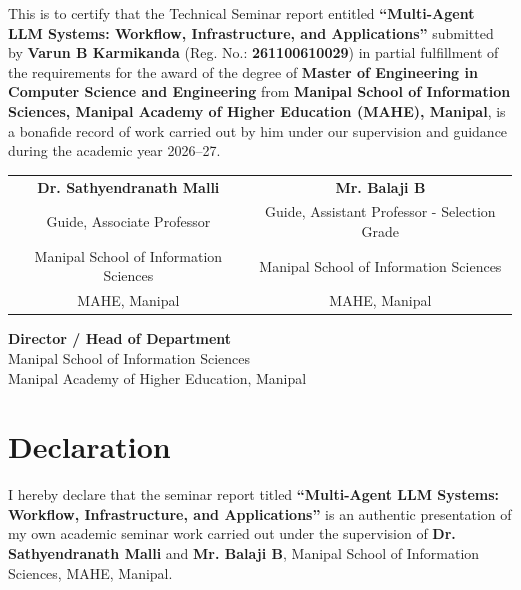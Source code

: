 \documentclass[12pt,a4paper]{report}
\begin{document}
\noindent This is to certify that the Technical Seminar report entitled \textbf{``Multi-Agent LLM Systems: Workflow, Infrastructure, and Applications''} submitted by \textbf{Varun B Karmikanda} (Reg. No.: \textbf{261100610029}) in partial fulfillment of the requirements for the award of the degree of \textbf{Master of Engineering in Computer Science and Engineering} from \textbf{Manipal School of Information Sciences, Manipal Academy of Higher Education (MAHE), Manipal}, is a bonafide record of work carried out by him under our supervision and guidance during the academic year 2026--27.

\vspace{2.5cm}

\noindent
\begin{tabular*}{\textwidth}{@{\extracolsep{\fill}}cc}
\textbf{Dr. Sathyendranath Malli} & \textbf{Mr. Balaji B} \\
Guide, Associate Professor & Guide, Assistant Professor - Selection Grade \\
Manipal School of Information Sciences & Manipal School of Information Sciences \\
MAHE, Manipal & MAHE, Manipal \\
\end{tabular*}

\vspace{2.5cm}

\noindent
\begin{center}
\textbf{Director / Head of Department} \\
Manipal School of Information Sciences \\
Manipal Academy of Higher Education, Manipal
\end{center}

\newpage
\chapter*{Declaration}

\noindent I hereby declare that the seminar report titled \textbf{``Multi-Agent LLM Systems: Workflow, Infrastructure, and Applications''} is an authentic presentation of my own academic seminar work carried out under the supervision of \textbf{Dr. Sathyendranath Malli} and \textbf{Mr. Balaji B}, Manipal School of Information Sciences, MAHE, Manipal.
\end{document}
